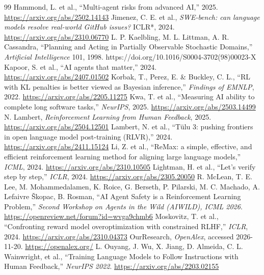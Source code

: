 \documentclass{article}
\begin{document}
\begin{thebibliography}{99}
 Hammond, L. et al., ``Multi-agent risks from advanced AI,'' 2025. \url{https://arxiv.org/abs/2502.14143}
 Jimenez, C. E. et al., \emph{SWE-bench: can language models resolve real-world GitHub issues? }ICLR*, 2024. \url{https://arxiv.org/abs/2310.06770}
 L. P. Kaelbling, M. L. Littman, A. R. Cassandra, ``Planning and Acting in Partially Observable Stochastic Domains,'' \emph{Artificial Intelligence} 101, 1998. https://doi.org/10.1016/S0004-3702(98)00023-X
 Kapoor, S. et al., ``AI agents that matter,'' 2024. \url{https://arxiv.org/abs/2407.01502}
 Korbak, T., Perez, E. \& Buckley, C. L., ``RL with KL penalties is better viewed as Bayesian inference,'' \emph{Findings of EMNLP}, 2022. \url{https://arxiv.org/abs/2205.11275}
 Kwa, T. et al., ``Measuring AI ability to complete long software tasks,'' \emph{NeurIPS}, 2025. \url{https://arxiv.org/abs/2503.14499}
 N. Lambert, \emph{Reinforcement Learning from Human Feedback}, 2025. \url{https://arxiv.org/abs/2504.12501}
 Lambert, N. et al., ``Tülu 3: pushing frontiers in open language model post-training (RLVR),'' 2024. \url{https://arxiv.org/abs/2411.15124}
 Li, Z. et al., ``ReMax: a simple, effective, and efficient reinforcement learning method for aligning large language models,'' \emph{ICML}, 2024. \url{https://arxiv.org/abs/2310.10505}
 Lightman, H. et al., ``Let's verify step by step,'' \emph{ICLR}, 2024. \url{https://arxiv.org/abs/2305.20050}
 R. McLean, T. E. Lee, M. Mohammedalamen, K. Roice, G. Berseth, P. Pilarski, M. C. Machado, A. Lefaivre Škopac, B. Rosman, ``AI Agent Safety is a Reinforcement Learning Problem,'' \emph{Second Workshop on Agents in the Wild (AIWILD), ICML 2026}. \url{https://openreview.net/forum?id=wvga9chmb6}
 Moskovitz, T. et al., ``Confronting reward model overoptimization with constrained RLHF,'' \emph{ICLR}, 2024. \url{https://arxiv.org/abs/2310.04373}
 OurResearch, \emph{OpenAlex}, accessed 2026-11-20. \url{https://openalex.org/}
 L. Ouyang, J. Wu, X. Jiang, D. Almeida, C. L. Wainwright, et al., ``Training Language Models to Follow Instructions with Human Feedback,'' \emph{NeurIPS 2022}. \url{https://arxiv.org/abs/2203.02155}

\end{thebibliography}
\end{document}
